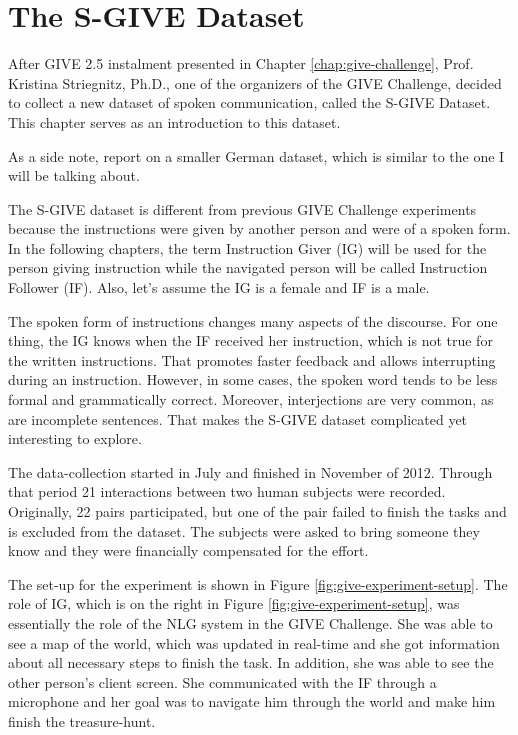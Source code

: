 \chapter{The S-GIVE Dataset}
\label{chap:s-give}
After GIVE 2.5 instalment presented in Chapter \ref{chap:give-challenge}, Prof. Kristina Striegnitz, Ph.D., one of the organizers of the GIVE Challenge, decided to collect a new dataset of spoken communication, called the S-GIVE Dataset. This chapter serves as an introduction to this dataset.

As a side note, \citet{striegnitz2012referring} report on a smaller German dataset, which is similar to the one I will be talking about. 

The S-GIVE dataset is different from previous GIVE Challenge experiments because the instructions were given by another person and were of a spoken form. In the following chapters, the term Instruction Giver (IG) will be used for the person giving instruction while the navigated person will be called Instruction Follower (IF). Also, let's assume the IG is a female and IF is a male.

The spoken form of instructions changes many aspects of the discourse. For one thing, the IG knows when the IF received her instruction, which is not true for the written instructions. That promotes faster feedback and allows interrupting during an instruction. However, in some cases, the spoken word tends to be less formal and grammatically correct. Moreover, interjections are very common, as are incomplete sentences. That makes the S-GIVE dataset complicated yet interesting to explore.

The data-collection started in July and finished in November of 2012. Through that period 21 interactions between two human subjects were recorded. Originally, 22 pairs participated, but one of the pair failed to finish the tasks and is excluded from the dataset. The subjects were asked to bring someone they know and they were financially compensated for the effort. 

The set-up for the experiment is shown in Figure \ref{fig:give-experiment-setup}. The role of IG, which is on the right in Figure \ref{fig:give-experiment-setup}, was essentially the role of the NLG system in the GIVE Challenge. She was able to see a map of the world, which was updated in real-time and she got information about all necessary steps to finish the task. In addition, she was able to see the other person's client screen. She communicated with the IF through a microphone and her goal was to navigate him through the world and make him finish the treasure-hunt.

